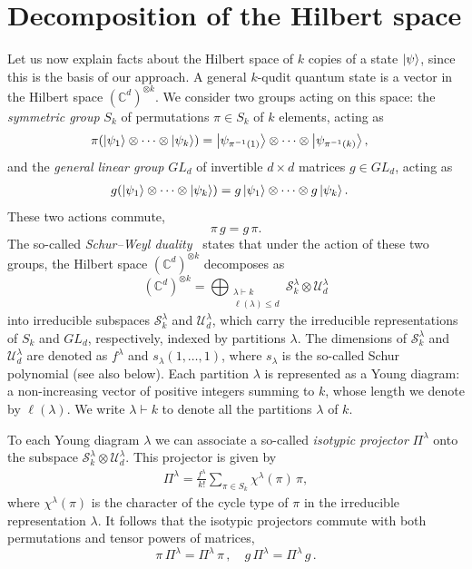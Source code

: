\documentclass[aps,pra,twocolumn,showpacs,superscriptaddress,groupedaddress]{revtex4-2}
\newcommand{\ot}[0]{\otimes}
\newcommand{\C}{\mathds{C}}
\newcommand{\cdk}{(\C^d)^{\otimes k}}
\begin{document}
\section{Decomposition of the
Hilbert space}
Let us now explain facts about the Hilbert space of $k$ copies of a state $\ket{\psi}$, since this is the basis of our approach.
A general $k$-qudit quantum state is a vector in the Hilbert space $\cdk$. We consider two groups acting on this space: the \emph{symmetric group} $S_k$ of permutations $\pi\in S_k$ of $k$ elements, acting as
\begin{align}
    \pi (\ket{\psi_1} \ot \dots \ot \ket{\psi_k}) &= \ket{\psi_{\pi^{-1}(1)}} \ot \dots \ot \ket{\psi_{\pi^{-1}(k)}},
\end{align}
and the \emph{general linear group} $GL_d$ of invertible $d\times d$ matrices $g\in GL_d$, acting as
\begin{align}
g(\ket{\psi_1} \ot \dots \ot \ket{\psi_k}) &=g\ket{\psi_1} \ot \dots \ot g\ket{\psi_k}.
\end{align}
These two actions commute,
\begin{equation}\label{eq:PerUniCommute}
    \pi \, g = g \, \pi.
\end{equation}
The so-called \emph{Schur--Weyl duality}~\cite{fulton2013representation} states that under the action of these two groups, the Hilbert space $\cdk$ decomposes as
\begin{equation}
    \cdk = \bigoplus_{\substack{\lambda\vdash k \\ \ell(\lambda)\leq d}} \mathcal{S}^\lambda_k \ot \mathcal{U}^\lambda_d
\end{equation}
into irreducible subspaces $\mathcal{S}^\lambda_k$ and $\mathcal{U}^\lambda_d$, which carry the irreducible representations
of $S_k$ and $GL_d$, respectively, indexed by partitions $\lambda$. The dimensions of $\mathcal{S}^\lambda_k$ and $\mathcal{U}^\lambda_d$ are denoted as $f^\lambda$ and $s_\lambda(1,\dots,1)$, where $s_\lambda$ is the so-called Schur polynomial (see also below). Each partition $\lambda$ is represented as a Young diagram: a non-increasing vector of positive integers summing to $k$, whose length we denote by $\ell(\lambda)$.  We write $\lambda \vdash k$ to denote all the partitions $\lambda$ of $k$.

To each Young diagram $\lambda$ we can associate a so-called {\em isotypic projector} $\Pi^\lambda$ onto the subspace $\mathcal{S}^\lambda_k \ot \mathcal{U}^\lambda_d$. This projector is given by
\begin{align}
    \Pi^\lambda = \frac{f^\lambda}{k!}\sum_{\pi \in S_k} \chi^\lambda(\pi)\, \pi,
\end{align}
where $\chi^\lambda(\pi)$ is the character of the cycle type of $\pi$ in the irreducible representation $\lambda$. It follows that the isotypic projectors commute with both permutations and tensor powers of matrices,
\begin{equation}
    \pi\,\Pi^\lambda = \Pi^\lambda\,\pi\,,\quad g\,\Pi^\lambda = \Pi^\lambda\,g\,.
\end{equation}
\end{document}
